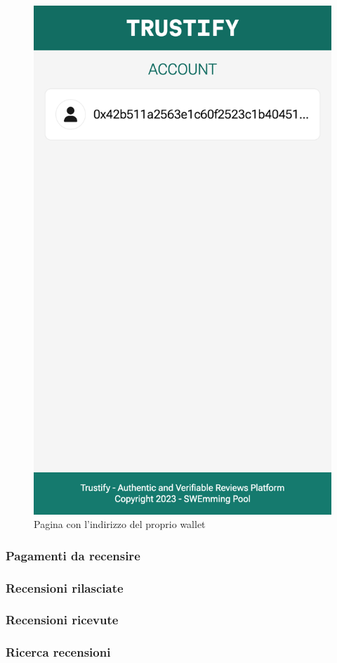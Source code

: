 \begin{figure}[H]
      \includegraphics[width=\linewidth]{src/img/account.png}
      \caption{Pagina con l'indirizzo del proprio wallet}\label{fig:account}
    \endminipage
\end{figure}


\subsubsection{Pagamenti da recensire}

\subsubsection{Recensioni rilasciate}

\subsubsection{Recensioni ricevute}

\subsubsection{Ricerca recensioni}